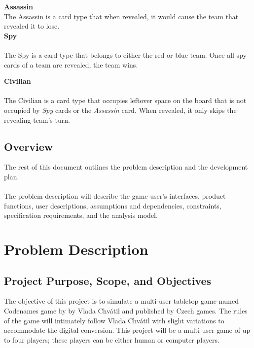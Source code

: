 \documentclass[10pt, a4paper]{article}
\begin{document}
	\textbf{Assassin} \\
	The Assassin is a card type that when revealed, it would cause the team that revealed it to lose.\\
	
	\textbf{Spy}\\
	\\
	The Spy is a card type that belongs to either the red or blue team. Once all spy cards of a team are revealed, the team wins.
	
	\textbf{Civilian}\\
	\\
	The Civilian is a card type that occupies leftover space on the board that is not occupied by \textit{Spy} cards or the \textit{Assassin} card. When revealed, it only skips the revealing team's turn. \\
	
	
	\subsection{Overview}
	
	The rest of this document outlines the problem description and the development plan. \\ 
	\\  
	The problem description will describe the game user's interfaces, product functions, user descriptions, assumptions and dependencies, constraints, specification requirements, and the analysis model. \\  
	
	\clearpage
	
	\section{Problem Description}
	
	\subsection{Project Purpose, Scope, and Objectives}
	
	The objective of this project is to simulate a multi-user tabletop game named Codenames game by by Vlada Chv\'atil and published by Czech games. The rules of the game will intimately follow Vlada Chv\'atil with slight variations to accommodate the digital conversion. This project will be a multi-user game of up to four players; these players can be either human or computer players.\\
	
\end{document}
